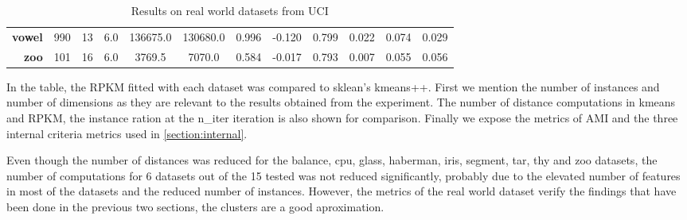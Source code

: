\begin{table}[ht!]
{\begin{tabular}{|r|ccccccccccc|}
    \textbf{vowel}         & 990                                    & 13                                      & 6.0                                     & 136675.0                                     & 130680.0                                          & 0.996                                        & -0.120                                & 0.799                            & 0.022                                   & 0.074                                   & 0.029                                    \\
    \textbf{zoo}           & 101                                    & 16                                      & 6.0                                     & 3769.5                                       & 7070.0                                            & 0.584                                        & -0.017                                & 0.793                            & 0.007                                   & 0.055                                   & 0.056                                    \\ \hline
    \end{tabular}}
    \caption{Results on real world datasets from UCI}
    \label{table:real}
\end{table}

In the table, the RPKM fitted with each dataset was compared to sklean's kmeans++. First we mention the number of instances and number of dimensions as they are relevant to the results obtained from the experiment. The number of distance computations in kmeans and RPKM, the instance ration at the n\_iter iteration is also shown for comparison. Finally we expose the metrics of AMI and the three internal criteria metrics used in \ref{section:internal}. 

Even though the number of distances was reduced for the balance, cpu, glass, haberman, iris, segment, tar, thy and zoo datasets, the number of computations for 6 datasets out of the 15 tested was not reduced significantly, probably due to the elevated number of features in most of the datasets and the reduced number of instances. However, the metrics of the real world dataset verify the findings that have been done in the previous two sections, the clusters are a good aproximation.
